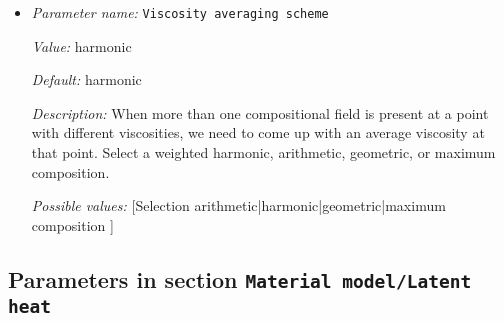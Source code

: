 \begin{itemize}
{\it Possible values:} [List list of <[Double 0...1.79769e+308 (inclusive)]> of length 0...4294967295 (inclusive)]
\item {\it Parameter name:} {\tt Viscosity averaging scheme}
\label{parameters:Material model/DiffusionDislocation/Viscosity averaging scheme}


{\it Value:} harmonic


{\it Default:} harmonic


{\it Description:} When more than one compositional field is present at a point with different viscosities, we need to come up with an average viscosity at that point.  Select a weighted harmonic, arithmetic, geometric, or maximum composition.


{\it Possible values:} [Selection arithmetic|harmonic|geometric|maximum composition ]
\end{itemize}

\subsection{Parameters in section \tt Material model/Latent heat}
\label{parameters:Material_20model/Latent_20heat}

